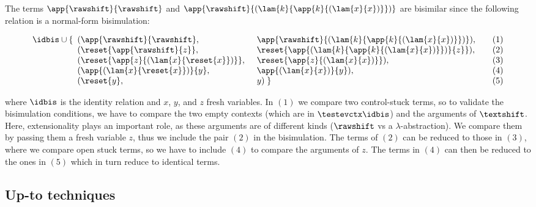 \documentclass{lmcs}
\theoremstyle{defC}
\begin{document}
\begin{exa}%
\label{ex:double-shift}
The terms $\app{\rawshift}{\rawshift}$ and
$\app{\rawshift}{(\lam{k}{\app{k}{(\lam{x}{x})}})}$ are bisimilar since the
following relation is a normal-form bisimulation:

\[
  \begin{array}{ll@{\hspace{5mm}}ll}
    \idbis \cup  \{  & \hspace{-0.5em} (\app{\rawshift}{\rawshift}, &
    \app{\rawshift}{(\lam{k}{\app{k}{(\lam{x}{x})}})}), &\quad (1) \\
     & \hspace{-0.5em} (\reset{\app{\rawshift}{z}}, &
    \reset{\app{(\lam{k}{\app{k}{(\lam{x}{x})}})}{z}}), &\quad (2) \\
     & \hspace{-0.5em} (\reset{\app{z}{(\lam{x}{\reset{x}})}}, &
    \reset{\app{z}{(\lam{x}{x})}}), &\quad (3)\\
     & \hspace{-0.5em} (\app{(\lam{x}{\reset{x}})}{y}, & \app{(\lam{x}{x})}{y}), & \quad(4) \\
     & \hspace{-0.5em} (\reset{y}, & y) \;\} & \quad(5)
  \end{array}
  \]

  \vspace{2mm}\noindent where $\idbis$ is the identity relation and $x$, $y$,
  and $z$ fresh variables. In $(1)$ we compare two control-stuck terms, so to
  validate the bisimulation conditions, we have to compare the two empty
  contexts (which are in $\testevctx\idbis$) and the arguments of $\textshift$.
  Here, extensionality plays an important role, as these arguments are of
  different kinds ($\rawshift$ vs a $\lambda$-abstraction). We compare them by
  passing them a fresh variable $z$, thus we include the pair $(2)$ in the
  bisimulation. The terms of $(2)$ can be reduced to those in $(3)$, where we
  compare open stuck terms, so we have to include $(4)$ to compare the arguments
  of $z$. The terms in $(4)$ can then be reduced to the ones in $(5)$ which in
  turn reduce to identical terms.
\end{exa}

\subsection{Up-to techniques}%
\label{ss:delcon-up-to-nf}
\end{document}
